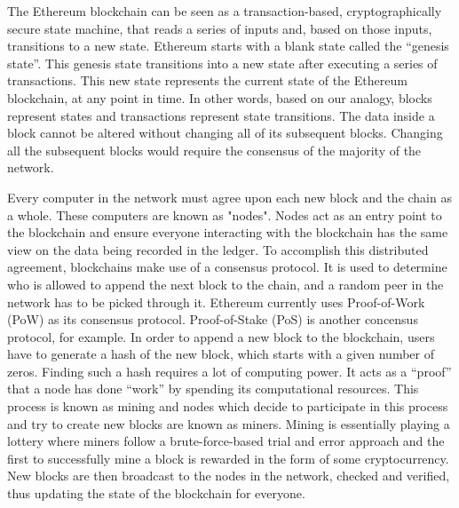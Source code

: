     The Ethereum blockchain can be seen as a transaction-based, cryptographically secure state machine, that reads a series of inputs and, based on those inputs, transitions to a new state.
    Ethereum starts with a blank state called the “genesis state”.
    This genesis state transitions into a new state after executing a series of transactions.
    This new state represents the current state of the Ethereum blockchain, at any point in time.
    In other words, based on our analogy, blocks represent states and transactions represent state transitions.
    The data inside a block cannot be altered without changing all of its subsequent blocks.
    Changing all the subsequent blocks would require the consensus of the majority of the network.

    Every computer in the network must agree upon each new block and the chain as a whole.
    These computers are known as "nodes".
    Nodes act as an entry point to the blockchain and ensure everyone interacting with the blockchain has the same view on the data being recorded in the ledger.
    To accomplish this distributed agreement, blockchains make use of a consensus protocol.
    It is used to determine who is allowed to append the next block to the chain, and a random peer in the network has to be picked through it.
    Ethereum currently uses Proof-of-Work (PoW) as its consensus protocol.
    Proof-of-Stake (PoS) is another concensus protocol, for example.
    In order to append a new block to the blockchain, users have to generate a hash of the new block, which starts with a given number of zeros.
    Finding such a hash requires a lot of computing power.
    It acts as a “proof” that a node has done “work” by spending its computational resources.
    This process is known as mining and nodes which decide to participate in this process and try to create new blocks are known as miners.
    Mining is essentially playing a lottery where miners follow a brute-force-based trial and error approach and the first to successfully mine a block is rewarded in the form of some cryptocurrency.
    New blocks are then broadcast to the nodes in the network, checked and verified, thus updating the state of the blockchain for everyone.

